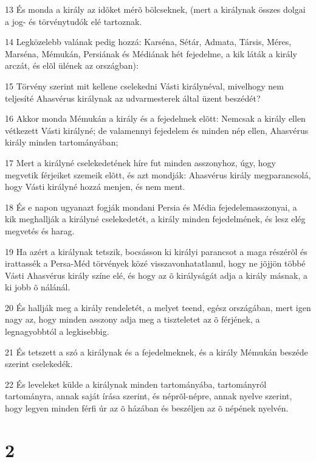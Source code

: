 \par 13 És monda a király az idõket mérõ bölcseknek, (mert a királynak összes dolgai a jog- és törvénytudók elé tartoznak.
\par 14 Legközelebb valának pedig hozzá: Karséna, Sétár, Admata, Társis, Méres, Marséna, Mémukán, Persiának és Médiának hét fejedelme, a kik láták a király arczát, és elõl ülének az országban):
\par 15 Törvény szerint mit kellene cselekedni Vásti királynéval, mivelhogy nem teljesíté Ahasvérus királynak az udvarmesterek által üzent beszédét?
\par 16 Akkor monda Mémukán a király és a fejedelmek elõtt: Nemcsak a király ellen vétkezett Vásti királyné; de valamennyi fejedelem és minden nép ellen, Ahasvérus király minden tartományában;
\par 17 Mert a királyné cselekedetének híre fut minden asszonyhoz, úgy, hogy megvetik férjeiket szemeik elõtt, és azt mondják: Ahasvérus király megparancsolá, hogy Vásti királyné hozzá menjen, és nem ment.
\par 18 És e napon ugyanazt fogják mondani Persia és Média fejedelemasszonyai, a kik meghallják a királyné cselekedetét, a király minden fejedelmének, és lesz elég megvetés és harag.
\par 19 Ha azért a királynak tetszik, bocsásson ki királyi parancsot a maga részérõl és irattassék a Persa-Méd törvények közé visszavonhatatlanul, hogy ne jõjjön többé Vásti Ahasvérus király színe elé, és hogy az õ királyságát adja a király másnak, a ki jobb õ nálánál.
\par 20 És hallják meg a király rendeletét, a melyet teend, egész országában, mert igen nagy az, hogy minden asszony adja meg a tiszteletet az õ férjének, a legnagyobbtól a legkisebbig.
\par 21 És tetszett a szó a királynak és a fejedelmeknek, és a király Mémukán beszéde szerint cselekedék.
\par 22 És leveleket külde a királynak minden tartományába, tartományról tartományra, annak saját írása szerint, és néprõl-népre, annak nyelve szerint, hogy legyen minden férfi úr az õ házában és beszéljen az õ népének nyelvén.

\chapter{2}

